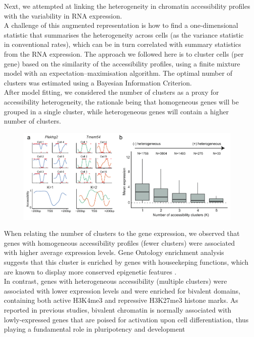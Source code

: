 Next, we attempted at linking the heterogeneity in chromatin accessibility profiles with the variability in RNA expression.\\
A challenge of this augmented representation is how to find a one-dimensional statistic that summarises the heterogeneity across cells (as the variance statistic in conventional rates), which can be in turn correlated with summary statistics from the RNA expression. The approach we followed here is to cluster cells (per gene) based on the similarity of the accessibility profiles, using a finite mixture model with an expectation–maximisation algorithm. The optimal number of clusters was estimated using a Bayesian Information Criterion.\\
After model fitting, we considered the number of clusters as a proxy for accessibility heterogeneity, the rationale being that homogeneous genes will be grouped in a single cluster, while heterogeneous genes will contain a higher number of clusters.\\

\begin{figure}[H]
	\centering
	\includegraphics[width=0.9\linewidth]{scNMT_profiles_clusters}
	\caption[]{}
	\label{fig:scnmt_profiles_clusters}
\end{figure}

When relating the number of clusters to the gene expression, we observed that genes with homogeneous accessibility profiles (fewer clusters) were associated with higher average expression levels. Gene Ontology enrichment analysis suggests that this cluster is enriched by genes with houseekeping functions, which are known to display more conserved epigenetic features \cite{She2009}.\\
In contrast, genes with heterogeneous accessibility (multiple clusters) were associated with lower expression levels and were enriched for bivalent domains, containing both active H3K4me3 and repressive H3K27me3 histone marks. As reported in previous studies, bivalent chromatin is normally associated with lowly-expressed genes that are poised for activation upon cell differentiation, thus playing a fundamental role in pluripotency and development \cite{Vastenhouw2012,Bernstein2006}

